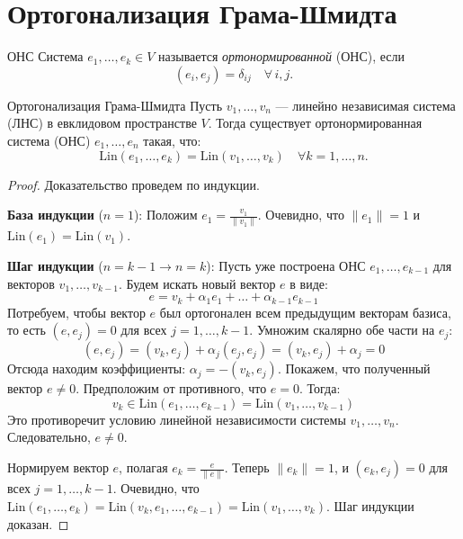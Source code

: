 \section{Ортогонализация Грама-Шмидта}

\begin{Definition}{ОНС}{}
	Система $e_1,\ldots,e_k \in V$ называется \textit{ортонормированной} (ОНС), если
	\[
	(e_i, e_j) = \delta_{ij} \quad \forall\, i, j.
	\] 
\end{Definition}

\begin{Theorem}{Ортогонализация Грама-Шмидта}{}
	Пусть $v_1, \dots, v_n$ — линейно независимая система (ЛНС) в евклидовом пространстве $V$.
	Тогда существует ортонормированная система (ОНС) $e_1, \dots, e_n$ такая, что:
	\[
	\mathrm{Lin}(e_1, \dots, e_k) = \mathrm{Lin}(v_1, \dots, v_k) \quad \forall k = 1, \dots, n.
	\]
\end{Theorem}

\begin{proof}
	Доказательство проведем по индукции.

	\textbf{База индукции} ($n = 1$):
	Положим $e_1 = \frac{v_1}{\|v_1\|}$. Очевидно, что $\|e_1\| = 1$ и $\mathrm{Lin}(e_1) = \mathrm{Lin}(v_1)$.

	\textbf{Шаг индукции} ($n = k - 1 \to n = k$):
	Пусть уже построена ОНС $e_1, \dots, e_{k-1}$ для векторов $v_1, \dots, v_{k-1}$.
	Будем искать новый вектор $e$ в виде:
	\[
	e = v_k + \alpha_1 e_1 + \dots + \alpha_{k-1} e_{k-1}
	\] 
	Потребуем, чтобы вектор $e$ был ортогонален всем предыдущим векторам базиса, то есть $(e, e_j) = 0$ для всех $j = 1, \dots, k-1$.
	Умножим скалярно обе части на $e_j$:
	\[
	(e, e_j) = (v_k, e_j) + \alpha_j (e_j, e_j) = (v_k, e_j) + \alpha_j = 0
	\] 
	Отсюда находим коэффициенты: $\alpha_j = -(v_k, e_j)$.
	Покажем, что полученный вектор $e \neq 0$. Предположим от противного, что $e = 0$.
	Тогда:
	\[
	v_k \in \mathrm{Lin}(e_1, \dots, e_{k-1}) = \mathrm{Lin}(v_1, \dots, v_{k-1})
	\] 
	Это противоречит условию линейной независимости системы $v_1, \dots, v_n$.
	Следовательно, $e \neq 0$.

	Нормируем вектор $e$, полагая $e_k = \frac{e}{\|e\|}$. Теперь $\|e_k\| = 1$, и $(e_k, e_j) = 0$ для всех $j = 1, \dots, k-1$.
	Очевидно, что $\mathrm{Lin}(e_1, \dots, e_k) = \mathrm{Lin}(v_k, e_1, \dots, e_{k-1}) = \mathrm{Lin}(v_1, \dots, v_k)$. Шаг индукции доказан.
\end{proof}
